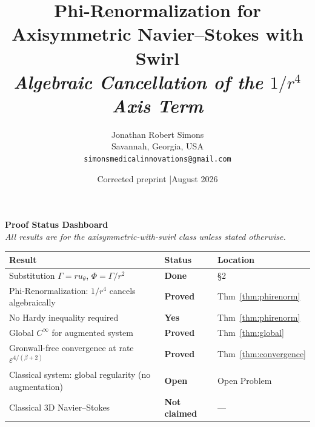 \documentclass[11pt]{article}
\title{\textbf{Phi-Renormalization for Axisymmetric Navier--Stokes with Swirl}\\[6pt]
\large\textit{Algebraic Cancellation of the $1/r^4$ Axis Term}}
\author{Jonathan Robert Simons\\
Savannah, Georgia, USA\\
\texttt{simonsmedicalinnovations@gmail.com}}
\date{Corrected preprint \quad|\quad August 2026}
\newcommand{\eps}{\varepsilon}
\begin{document}
\maketitle

\begin{center}
\end{center}
\vspace{0.5em}

\begin{mdframed}[linecolor=darkblue,linewidth=1.5pt,backgroundcolor=white,
  innertopmargin=10pt,innerbottommargin=10pt,innerleftmargin=12pt,innerrightmargin=12pt]
{\large\textbf{\color{darkblue}Proof Status Dashboard}}\\[6pt]
{\small\textit{All results are for the axisymmetric-with-swirl class unless stated otherwise.}}\\[6pt]
\begin{tabular}{>{\raggedright\arraybackslash}p{8cm}
                >{\centering\arraybackslash}p{2.3cm}
                >{\raggedright\arraybackslash}p{3cm}}
\toprule
\textbf{Result} & \textbf{Status} & \textbf{Location}\\
\midrule
\rowcolor{lightgreen}
Substitution $\Gamma=ru_\theta$, $\Phi=\Gamma/r^2$ & \textcolor{proved}{\textbf{Done}} & \S2 \\
\rowcolor{lightgreen}
Phi-Renormalization: $1/r^4$ cancels algebraically & \textcolor{proved}{\textbf{Proved}} & Thm~\ref{thm:phirenorm} \\
\rowcolor{lightgreen}
No Hardy inequality required & \textcolor{proved}{\textbf{Yes}} & Thm~\ref{thm:phirenorm} \\
\rowcolor{lightgreen}
Global $C^\infty$ for augmented system & \textcolor{proved}{\textbf{Proved}} & Thm~\ref{thm:global} \\
\rowcolor{lightgreen}
Gronwall-free convergence at rate $\eps^{4/(\beta+2)}$ & \textcolor{proved}{\textbf{Proved}} & Thm~\ref{thm:convergence} \\
\midrule
\rowcolor{lightred}
Classical system: global regularity (no augmentation) & \textcolor{open}{\textbf{Open}} & Open Problem \\
\rowcolor{lightgray}
Classical 3D Navier--Stokes & \textcolor{notclaimed}{\textbf{Not claimed}} & --- \\
\bottomrule
\end{tabular}
\end{mdframed}
\end{document}
